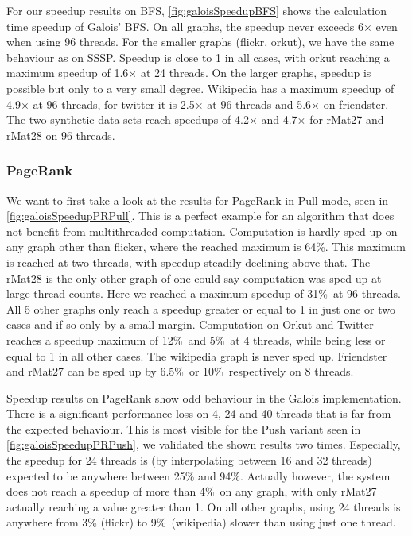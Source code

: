For our speedup results on BFS, \autoref{fig:galoisSpeedupBFS} shows the calculation time speedup of Galois' BFS.
On all graphs, the speedup never exceeds 6$\times$ even when using 96 threads.
For the smaller graphs (flickr, orkut), we have the same behaviour as on SSSP. Speedup is close to 1 in all cases, with orkut reaching a maximum speedup of 1.6$\times$ at 24 threads.
On the larger graphs, speedup is possible but only to a very small degree.
Wikipedia has a maximum speedup of 4.9$\times$ at 96 threads, for twitter it is 2.5$\times$ at 96 threads and 5.6$\times$ on friendster. The two synthetic data sets reach speedups of 4.2$\times$ and 4.7$\times$ for rMat27 and rMat28 on 96 threads.


\subsubsection{PageRank}








We want to first take a look at the results for PageRank in Pull mode, seen in \autoref{fig:galoisSpeedupPRPull}. This is a perfect example for an algorithm that does not benefit from multithreaded computation.
Computation is hardly sped up on any graph other than flicker, where the reached maximum is 64\%. This maximum is reached at two threads, with speedup steadily declining above that.
The rMat28 is the only other graph of one could say computation was sped up at large thread counts. Here we reached a maximum speedup of 31\%\ at 96 threads.
All 5 other graphs only reach a speedup greater or equal to 1 in just one or two cases and if so only by a small margin.
Computation on Orkut and Twitter reaches a speedup maximum of 12\%\ and 5\%\ at 4 threads, while being less or equal to 1 in all other cases.
The wikipedia graph is never sped up.
Friendster and rMat27 can be sped up by 6.5\%\ or 10\%\ respectively on 8 threads.

Speedup results on PageRank show odd behaviour in the Galois implementation.
There is a significant performance loss on 4, 24 and 40 threads that is far from the expected behaviour. This is most visible for the Push variant seen in \autoref{fig:galoisSpeedupPRPush}, we validated the shown results two times.
Especially, the speedup for 24 threads is (by interpolating between 16 and 32 threads) expected to be anywhere between 25\% and 94\%.
Actually however, the system does not reach a speedup of more than 4\%\ on any graph, with only rMat27 actually reaching a value greater than 1.
On all other graphs, using 24 threads is anywhere from 3\% (flickr) to 9\%\ (wikipedia) slower than using just one thread.


